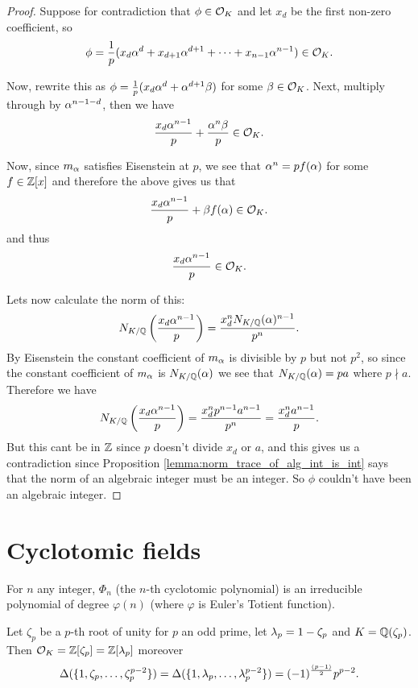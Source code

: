 \begin{proof}
	Suppose for contradiction that $\phi \in \mathcal{O}_K$ and let $x_d$ be the first non-zero coefficient, so \[\phi=\frac{1}{p}(x_d\alpha^d+x_{d+1}\alpha^{d+1}+\cdots+x_{n-1}\alpha^{n-1}) \in \mathcal{O}_K.\]

	Now, rewrite this as $\phi=\frac{1}{p}(x_d\alpha^d +\alpha^{d+1}\beta)$ for some $\beta \in \mathcal{O}_K$. Next, multiply through by $\alpha^{n-1-d}$, then we have \[\frac{x_d\alpha^{n-1}}{p}+\frac{\alpha^n\beta}{p} \in \mathcal{O}_K.\]

	Now, since  $m_\alpha$ satisfies Eisenstein at $p$, we see that $\alpha^n=pf(\alpha)$ for some $f \in \mathbb{Z}[x]$ and therefore the above gives us that \[\frac{x_d\alpha^{n-1}}{p}+\beta f(\alpha) \in \mathcal{O}_K.\] and thus \[\frac{x_d\alpha^{n-1}}{p} \in \mathcal{O}_K.\]

	Lets now calculate the norm of this: \[N_{K/\mathbb{Q}} \left(\frac{x_d\alpha^{n-1}}{p} \right)=\frac{x_d^n N_{K/\mathbb{Q}}(\alpha)^{n-1}}{p^n}.\] By Eisenstein the constant coefficient of $m_\alpha$ is divisible by $p$ but not $p^2$, so since the constant coefficient of $m_\alpha$ is $N_{K/\mathbb{Q}}(\alpha)$ we see that $N_{K/\mathbb{Q}}(\alpha)=p a$ where $p \nmid a$. Therefore we have \[N_{K/\mathbb{Q}} \left(\frac{x_d\alpha^{n-1}}{p} \right)=\frac{x_d^n p^{n-1}a^{n-1}}{p^n}= \frac{x_d^n a^{n-1}}{p}.\] But this cant be in $\mathbb{Z}$ since $p$ doesn't divide $x_d$ or $a$, and this gives us a contradiction since  Proposition \ref{lemma:norm_trace_of_alg_int_is_int} says that the norm of an algebraic integer must be an integer. So $\phi$ couldn't have been an algebraic integer.


\end{proof}

\section{Cyclotomic fields}


\begin{lemma}\label{lemma:cyclo_poly}
	For $n$ any integer, $\Phi_n$ (the $n$-th cyclotomic polynomial) is an irreducible polynomial of degree $\varphi(n)$ (where $\varphi$ is Euler's Totient function).
\end{lemma}




\begin{theorem}\label{theorem:ring_of_ints_of_cyclo}
	Let $\zeta_p$ be a $p$-th root of unity for $p$ an odd prime, let $\lambda_p=1-\zeta_p$ and $K=\mathbb{Q}(\zeta_p)$. Then $\mathcal{O}_K=\mathbb{Z}[\zeta_p]=\mathbb{Z}[\lambda_p]$ moreover \[\Delta(\{1,\zeta_p,\dots,\zeta_p^{p-2}\})=\Delta(\{1,\lambda_p,\dots,\lambda_p^{p-2}\})=(-1)^{\frac{(p-1)}{2}}p^{p-2}.\]
\end{theorem}

